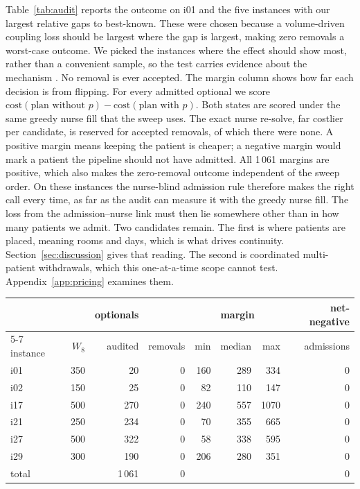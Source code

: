 \documentclass[11pt]{article}
\begin{document}
	Table~\ref{tab:audit} reports the outcome on i01 and the five instances with our largest relative
	gaps to best-known. These were chosen because a volume-driven coupling loss should be largest where
	the gap is largest, making zero removals a worst-case outcome. We picked the instances where the
	effect should show most, rather than a convenient sample, so the test carries evidence about
	the mechanism \citep{hooker1995}. No removal is ever accepted. The margin column shows how far each decision is from flipping. For every admitted optional we score $\mathrm{cost}(\text{plan without }p)-\mathrm{cost}(\text{plan with }p)$. Both states are scored under the same greedy nurse fill that the sweep uses. The exact nurse re-solve, far costlier per candidate, is reserved for accepted removals, of which there were none. A
	positive margin means keeping the patient is cheaper; a
	negative margin would mark a patient the pipeline should not have admitted. All 1\,061 margins are
	positive, which also makes the zero-removal outcome independent of the sweep order. On these instances the nurse-blind admission rule therefore makes the right call every time, as far as the audit can measure it with the greedy nurse fill. The loss from the admission--nurse link must then lie somewhere other than in how many patients we admit. Two candidates remain. The first is where patients are placed, meaning rooms and days, which is what drives continuity. Section~\ref{sec:discussion} gives that reading. The second is coordinated multi-patient withdrawals, which this one-at-a-time scope cannot test. Appendix~\ref{app:pricing} examines them.

	\begin{center}
		\label{tab:audit}
		\small
		\begin{tabular}{@{}lrrrrrrr@{}}
			\toprule
			& & optionals & & \multicolumn{3}{c}{margin} & net-negative\\
			\cmidrule(lr){5-7}
			instance & $W_8$ & audited & removals & min & median & max & admissions\\
			\midrule
			i01 & 350 & 20 & 0 & 160 & 289 & 334 & 0\\
			i02 & 150 & 25 & 0 & 82 & 110 & 147 & 0\\
			i17 & 500 & 270 & 0 & 240 & 557 & 1070 & 0\\
			i21 & 250 & 234 & 0 & 70 & 355 & 665 & 0\\
			i27 & 500 & 322 & 0 & 58 & 338 & 595 & 0\\
			i29 & 300 & 190 & 0 & 206 & 280 & 351 & 0\\
			\midrule
			total & & 1\,061 & 0 & & & & 0\\
			\bottomrule
		\end{tabular}
	\end{center}
\end{document}
